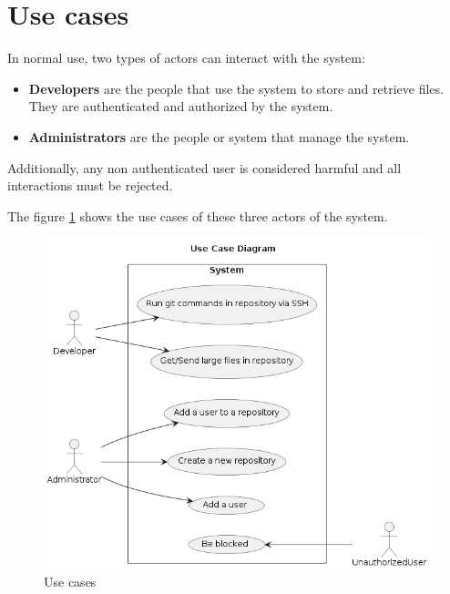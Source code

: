 \section{Use cases}

In normal use, two types of actors can interact with the system:

\begin{itemize}
    \item \textbf{Developers} are the people that use the system to store and retrieve files. They are authenticated and authorized by the system.
    \item \textbf{Administrators} are the people or system that manage the system.
\end{itemize}

Additionally, any non authenticated user is considered harmful and all interactions must be rejected.

The figure \ref{fig:use_cases} shows the use cases of these three actors of the system. 

\begin{figure}[h]
    \centering
    \includegraphics[width=\textwidth]{iteration_01/diagrams/use_cases.png}
    \caption{Use cases}
    \label{fig:use_cases}
\end{figure}
